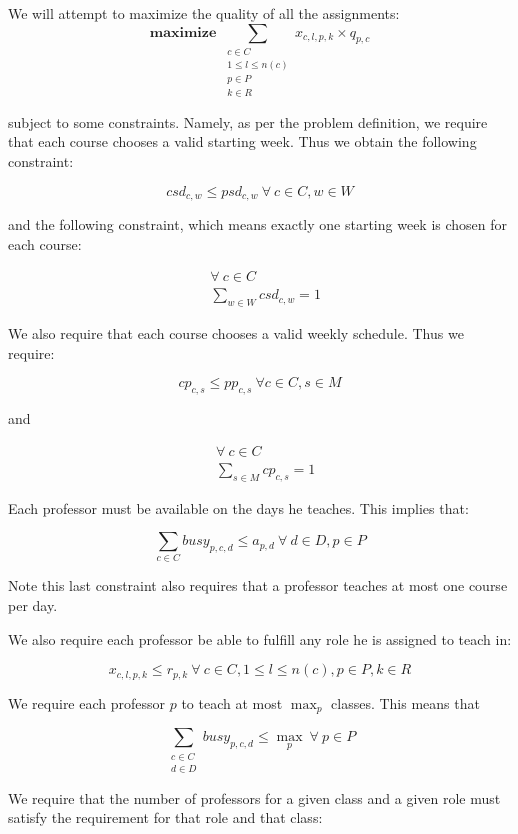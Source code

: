 We will attempt to maximize the quality of all the assignments:
$$
\textbf{maximize } \sum_{\substack{c \in C\\1 \le l \le n(c)\\p \in P\\k \in R}} x_{c, l, p, k} \times q_{p, c}
$$

subject to some constraints. Namely, as per the problem definition, we require that each course chooses a valid starting week. Thus we obtain the following constraint:

$$
csd_{c, w} \le psd_{c, w}\ \forall\ c \in C, w \in W
$$

and the following constraint, which means exactly one starting week is chosen for each course:

\begin{align*}
  &\forall\ c \in C\\
  &\sum_{w \in W} csd_{c, w} = 1
\end{align*}

We also require that each course chooses a valid weekly schedule. Thus we require:

$$
cp_{c, s} \le pp_{c, s}\ \forall c \in C, s \in M
$$

and

\begin{align*}
  &\forall\ c \in C\\
  &\sum_{s \in M} cp_{c, s} = 1
\end{align*}

Each professor must be available on the days he teaches. This implies that:

$$
\sum_{c \in C} busy_{p, c, d} \le a_{p, d}\ \forall\ d \in D, p \in P
$$

Note this last constraint also requires that a professor teaches at most one course per day.

We also require each professor be able to fulfill any role he is assigned to teach in:

$$
x_{c, l, p, k} \le r_{p, k}\ \forall\ c \in C, 1 \le l \le n(c), p \in P, k \in R
$$

We require each professor $p$ to teach at most $\max_p$ classes. This means that

$$
\sum_{\substack{c \in C\\d \in D}} busy_{p, c, d} \le \textstyle{\max_p}\ \forall\ p \in P
$$

We require that the number of professors for a given class and a given role must satisfy the requirement for that role and that class:

